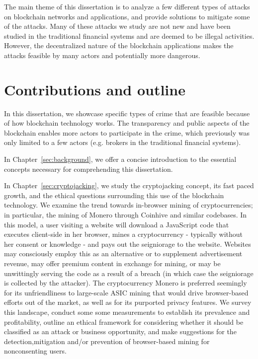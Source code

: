The main theme of this dissertation is to analyze a few different types of attacks on blockchain networks and applications, and provide solutions to mitigate some of the attacks. Many of these attacks we study are not new and have been studied in the traditional financial systems and are deemed to be illegal activities. However, the decentralized nature of the blockchain applications makes the attacks feasible by many actors and potentially more dangerous. 



\section{Contributions and outline} %
In this dissertation, we showcase specific types of crime that are feasible because of how blockchain technology works. The transparency and public aspects of the blockchain enables more actors to participate in the crime, which previously was only limited to a few actors (e.g. brokers in the traditional financial systems). 

In Chapter~\ref{sec:background}, we offer a concise introduction to the essential concepts necessary for comprehending this dissertation. 

In Chapter~\ref{sec:cryptojacking}, we study the cryptojacking concept, its fast paced growth, and the ethical questions surrounding this use of the blockchain technology. We examine the trend towards in-browser mining of cryptocurrencies; in particular, the mining of Monero through Coinhive and similar codebases. In this model, a user visiting a website will download a JavaScript code that executes client-side in her browser, mines a cryptocurrency - typically without her consent or knowledge - and pays out the seigniorage to the website. Websites may consciously employ this as an alternative or to supplement advertisement revenue, may offer premium content in exchange for mining, or may be unwittingly serving the code as a result of a breach (in which case the seigniorage is collected by the attacker). The cryptocurrency Monero is preferred seemingly for its unfriendliness to large-scale ASIC mining that would drive browser-based efforts out of the market, as well as for its purported privacy features. We survey this landscape, conduct some some measurements to establish its prevalence and profitability, outline an ethical framework for considering whether it should be classified as an attack or business opportunity, and make suggestions for the detection,mitigation and/or prevention of browser-based mining for nonconsenting users.


